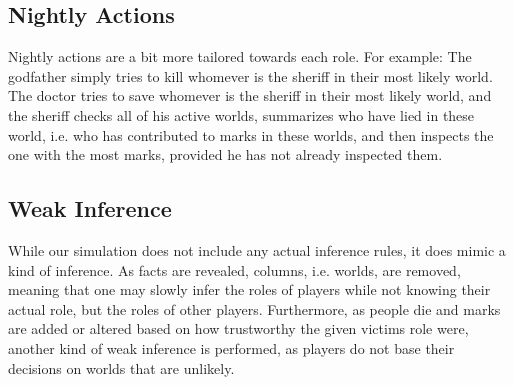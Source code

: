 \subsection{Nightly Actions}\label{NightlyActions}
Nightly actions are a bit more tailored towards each role. For example: The 
godfather simply tries to kill whomever is the sheriff in their most likely 
world. The doctor tries to save whomever is the sheriff in their most likely 
world, and the sheriff checks all of his active worlds, summarizes who have 
lied in these world, i.e. who has contributed to marks in these worlds, and 
then inspects the one with the most marks, provided he has not already 
inspected them. 
\subsection{Weak Inference}\label{WeakInference}
While our simulation does not include any actual inference rules, it does mimic 
a kind of inference. As facts are revealed, columns, i.e. worlds, are removed, 
meaning that one may slowly infer the roles of players while not knowing their 
actual role, but the roles of other players. Furthermore, as people die and 
marks are added or altered based on how trustworthy the given victims role 
were, another kind of weak inference is performed, as players do not base their 
decisions on worlds that are unlikely. 
